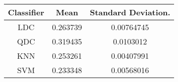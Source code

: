\begin{tabular}{|c|c|c|}
 \hline 
Classifier & Mean & Standard Deviation. \\ 
 \hline 
LDC & 0.263739 & 0.00764745 \\ 
 \hline 
QDC & 0.319435 & 0.0103012 \\ 
 \hline 
KNN & 0.253261 & 0.00407991 \\ 
 \hline 
SVM & 0.233348 & 0.00568016 \\ 
 \hline 
\end{tabular}